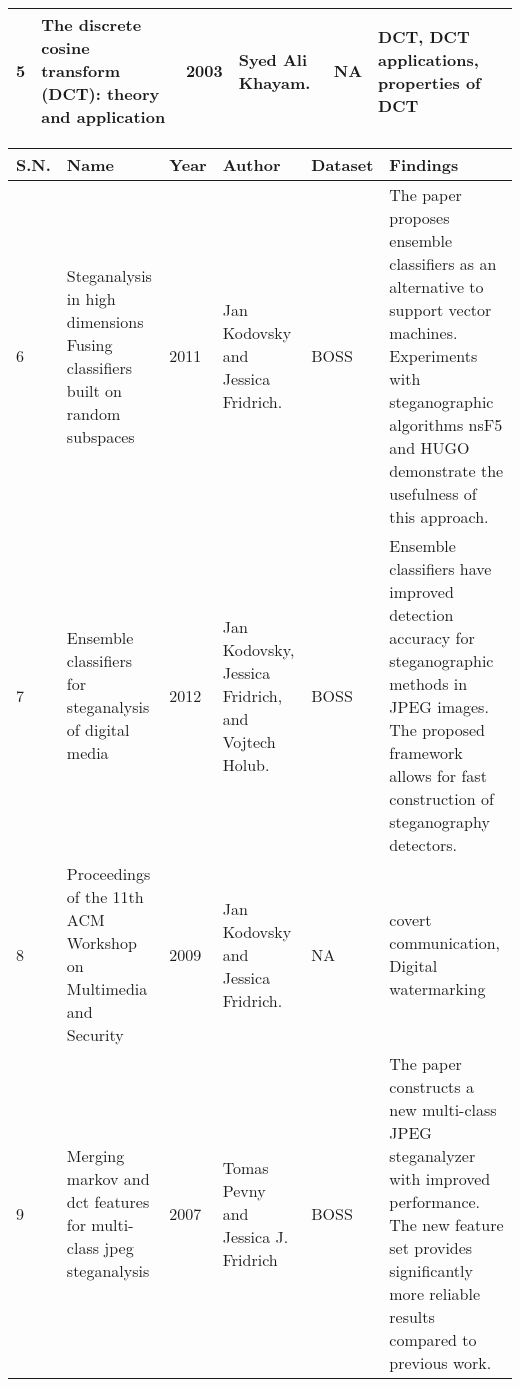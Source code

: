 \begin{table}[!h]
\begin{tabular}{|p{0.7cm}|p{3cm}|p{0.8cm}|p{3cm}|p{1.3cm}|p{3cm}|}
        5    & The discrete cosine transform (DCT): theory and application                      & 2003 & Syed Ali   Khayam.                                                                     & NA               & DCT, DCT applications, properties of DCT                                                                                                                                                                                                \\\hline

        \end{tabular}
\end{table}
\clearpage
\begin{table}[!h]
    \begin{tabular}{|p{0.7cm}|p{3cm}|p{0.8cm}|p{3cm}|p{1.3cm}|p{3cm}|}
        \hline
    S.N. & Name                                                                            & Year & Author                                                                                 & Dataset          & Findings                                                                                                                                                                                          \\\hline
    6    & Steganalysis in high dimensions Fusing classifiers built on random subspaces    & 2011 & Jan Kodovsky and Jessica Fridrich.                                                     & BOSS             & The paper proposes ensemble classifiers as an alternative   to support vector machines. Experiments with steganographic algorithms nsF5   and HUGO demonstrate the usefulness of this approach.   \\\hline
    7    & Ensemble classifiers for steganalysis of digital media                          & 2012 & Jan Kodovsky, Jessica Fridrich, and Vojtech Holub.                                     & BOSS             & Ensemble classifiers have improved detection accuracy for steganographic methods in JPEG images. The proposed framework allows for fast construction of steganography detectors.                  \\\hline
    8    & Proceedings of the 11th ACM Workshop on Multimedia and Security                 & 2009 & Jan Kodovsky and Jessica Fridrich.                                                     & NA            &  covert communication, Digital watermarking                                                                                                                                                                                                 \\\hline
        9    & Merging markov and dct features for multi-class jpeg steganalysis               & 2007 & Tomas Pevny and   Jessica J. Fridrich                                                  & BOSS             & The paper   constructs a new multi-class JPEG steganalyzer with improved performance. The   new feature set provides significantly more reliable results compared to   previous work.             \\\hline
    \end{tabular}
\end{table} 
